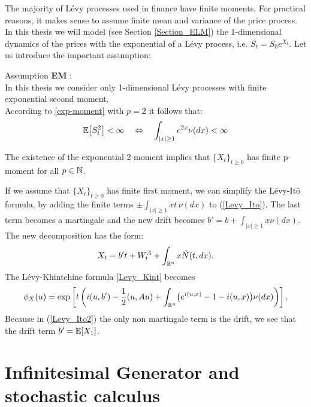 The majority of Lévy processes used in finance have finite moments.
For practical reasons, it makes sense to assume finite mean and variance of the price process.
In this thesis we will model (see Section \ref{Section_ELM}) the 1-dimensional dynamics of the prices with the exponential of a Lévy process, 
i.e. $S_t = S_0 e^{X_t}$. Let us introduce the important assumption:  
\begin{center}
\begin{riquadro}{12cm}
Assumption \textbf{EM}\label{AssumptionEM}  :\\
In this thesis we consider only 1-dimensional Lévy processes with finite exponential second moment.\\
According to \ref{exp-moment} with $p=2$ it follows that:
$$ \mathbb{E}\bigl[ S_t^2 \bigr] < \infty \quad \Leftrightarrow  \quad \int_{|x| \geq 1} e^{2x} \nu(dx) <\infty $$
\end{riquadro}
\end{center}

The existence of the exponential 2-moment implies that $\{X_t\}_{t \geq 0}$ has finite p-moment for all $p \in \mathbb{N}$.


\vspace{1.5em}

If we assume that $\{X_t\}_{t \geq 0}$ has finite first moment, we can simplify the Lévy-It\={o} formula, by adding the finite terms $\pm \int_{|x| \geq 1} x t\, \nu(dx)$ 
to (\ref{Levy_Ito}). The last term becomes a martingale and the new drift becomes $b' = b+\int_{|x| \geq 1} x \nu(dx)$.\\
The new decomposition has the form:
\begin{equation}\label{Levy_Ito2}
 X_t = b't + W^A_t + \int_{\mathbb{R}^n} x \tilde{N}(t,dx).
\end{equation}
The Lévy-Khintchine formula \ref{Levy_Kint} becomes
\begin{equation}\label{Levy_Kint2}
\phi_X(u) = \mbox{exp} \left[ t \left( i(u,b') - \frac{1}{2}(u,Au) + \int_{\mathbb{R}^n} 
	   \bigl( e^{i(u,x)} -1 -i(u,x) \bigr) \nu(dx) \right) \right]. 
\end{equation}
Because in (\ref{Levy_Ito2}) the only non martingale term is the drift, we see that the drift term $b' = \mathbb{E}[ X_{1} ]$.


\section{Infinitesimal Generator and stochastic calculus}\label{Infinitesimal_generator_stoch_calc}

